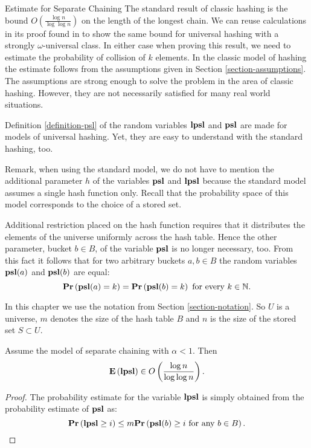 \begin{section}{Estimate for Separate Chaining}
The standard result of classic hashing is the bound $O\left(\frac{\log n}{\log \log n}\right)$ on the length of the longest chain. We can reuse calculations in its proof found in \cite{DBLP:books/sp/Mehlhorn84} to show the same bound for universal hashing with a strongly $\omega$-universal class. In either case when proving this result, we need to estimate the probability of collision of $k$ elements. In the classic model of hashing the estimate follows from the assumptions given in Section \ref{section-assumptions}. The assumptions are strong enough to solve the problem in the area of classic hashing. However, they are not necessarily satisfied for many real world situations. 

Definition \ref{definition-psl} of the random variables $\mathbf{lpsl}$ and $\mathbf{psl}$ are made for models of universal hashing. Yet, they are easy to understand with the standard hashing, too. 

Remark, when using the standard model, we do not have to mention the additional parameter $h$ of the variables $\mathbf{psl}$ and $\mathbf{lpsl}$ because the standard model assumes a single hash function only. Recall that the probability space of this model corresponds to the choice of a stored set. 

Additional restriction placed on the hash function requires that it distributes the elements of the universe uniformly across the hash table. Hence the other parameter, bucket $b \in B$, of the variable $\mathbf{psl}$ is no longer necessary, too. From this fact it follows that for two arbitrary buckets $a, b \in B$ the random variables $\mathbf{psl}(a)$ and $\mathbf{psl}(b)$ are equal: \[\mathbf{Pr}\left(\mathbf{psl}(a) = k\right) = \mathbf{Pr}\left(\mathbf{psl}(b) = k\right) \text{ for every } k \in \mathbb{N} \text{.}\] 

In this chapter we use the notation from Section \ref{section-notation}. So $U$ is a universe, $m$ denotes the size of the hash table $B$ and $n$ is the size of the stored set $S \subset U$.

\begin{theorem}
Assume the model of separate chaining with $\alpha < 1$. Then 
\[
\mathbf{E}\left(\mathbf{lpsl}\right) \in O\left(\frac{\log n}{\log \log n}\right) \text{.}
\]
\end{theorem}
\begin{proof}
The probability estimate for the variable $\mathbf{lpsl}$ is simply obtained from the probability estimate of $\mathbf{psl}$ as:
\begin{displaymath}
\mathbf{Pr}\left(\mathbf{lpsl} \geq i\right) \leq m \mathbf{Pr}\left(\mathbf{psl}(b) \geq i \text{ for any } b \in B\right) \text{.}
\end{displaymath}


\end{proof}
\end{section}
